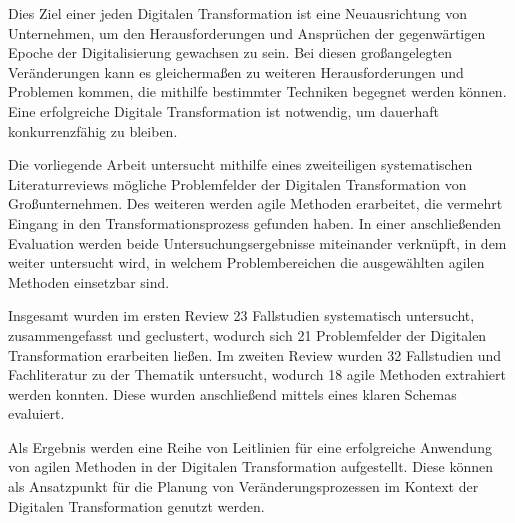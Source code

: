 
Dies Ziel einer jeden Digitalen Transformation ist eine Neuausrichtung von Unternehmen, um den Herausforderungen und Ansprüchen der gegenwärtigen Epoche der Digitalisierung gewachsen zu sein. Bei diesen großangelegten Veränderungen kann es gleichermaßen zu weiteren Herausforderungen und Problemen kommen, die mithilfe bestimmter Techniken begegnet werden können. Eine erfolgreiche Digitale Transformation ist notwendig, um dauerhaft konkurrenzfähig zu bleiben. 

Die vorliegende Arbeit untersucht mithilfe eines zweiteiligen systematischen Literaturreviews mögliche Problemfelder der Digitalen Transformation von Großunternehmen. Des weiteren werden agile Methoden erarbeitet, die vermehrt Eingang in den Transformationsprozess gefunden haben. In einer anschließenden Evaluation werden beide Untersuchungsergebnisse miteinander verknüpft, in dem weiter untersucht wird, in welchem Problembereichen die ausgewählten agilen Methoden einsetzbar sind.

Insgesamt wurden im ersten Review 23 Fallstudien systematisch untersucht, zusammengefasst und geclustert, wodurch sich 21 Problemfelder der Digitalen Transformation erarbeiten ließen. Im zweiten Review wurden 32 Fallstudien und Fachliteratur zu der Thematik untersucht, wodurch 18 agile Methoden extrahiert werden konnten. Diese wurden anschließend mittels eines klaren Schemas evaluiert.

Als Ergebnis werden eine Reihe von Leitlinien für eine erfolgreiche Anwendung von agilen Methoden in der Digitalen Transformation aufgestellt. Diese können als Ansatzpunkt für die Planung von Veränderungsprozessen im Kontext der Digitalen Transformation genutzt werden.

